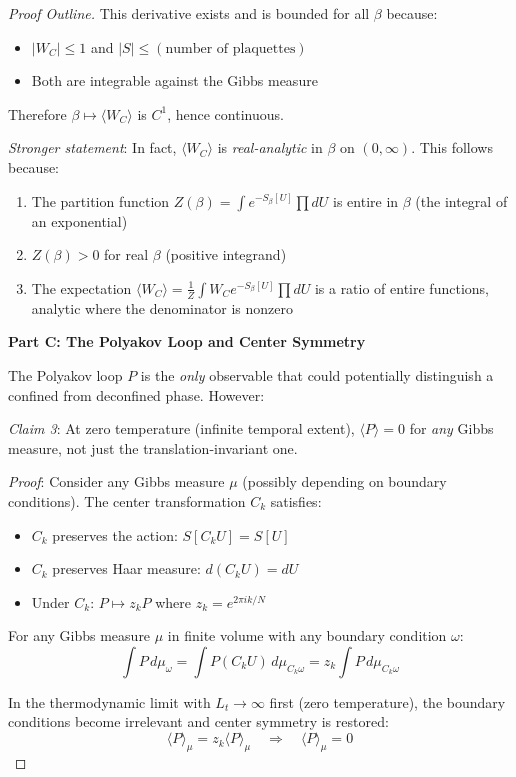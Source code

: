 \begin{proof}[Proof Outline]
This derivative exists and is bounded for all $\beta$ because:
\begin{itemize}
\item $|W_C| \leq 1$ and $|S| \leq (\text{number of plaquettes})$
\item Both are integrable against the Gibbs measure
\end{itemize}

Therefore $\beta \mapsto \langle W_C \rangle$ is $C^1$, hence continuous.

\textit{Stronger statement}: In fact, $\langle W_C \rangle$ is \emph{real-analytic} 
in $\beta$ on $(0, \infty)$. This follows because:
\begin{enumerate}[label=(\alph*)]
\item The partition function $Z(\beta) = \int e^{-S_\beta[U]} \prod dU$ is 
entire in $\beta$ (the integral of an exponential)
\item $Z(\beta) > 0$ for real $\beta$ (positive integrand)
\item The expectation $\langle W_C\rangle = \frac{1}{Z}\int W_C e^{-S_\beta[U]} \prod dU$ 
is a ratio of entire functions, analytic where the denominator is nonzero
\end{enumerate}

\textbf{Part C: The Polyakov Loop and Center Symmetry}

The Polyakov loop $P$ is the \emph{only} observable that could potentially 
distinguish a confined from deconfined phase. However:

\textit{Claim 3}: At zero temperature (infinite temporal extent), 
$\langle P \rangle = 0$ for \emph{any} Gibbs measure, not just the 
translation-invariant one.

\textit{Proof}: Consider any Gibbs measure $\mu$ (possibly depending on 
boundary conditions). The center transformation $C_k$ satisfies:
\begin{itemize}
\item $C_k$ preserves the action: $S[C_k U] = S[U]$
\item $C_k$ preserves Haar measure: $d(C_k U) = dU$
\item Under $C_k$: $P \mapsto z_k P$ where $z_k = e^{2\pi i k/N}$
\end{itemize}

For any Gibbs measure $\mu$ in finite volume with any boundary condition $\omega$:
\[
\int P \, d\mu_\omega = \int P(C_k U) \, d\mu_{C_k \omega} = z_k \int P \, d\mu_{C_k\omega}
\]

In the thermodynamic limit with $L_t \to \infty$ first (zero temperature), 
the boundary conditions become irrelevant and center symmetry is restored:
\[
\langle P \rangle_\mu = z_k \langle P \rangle_\mu \quad \Rightarrow \quad \langle P \rangle_\mu = 0
\]


\end{proof}
